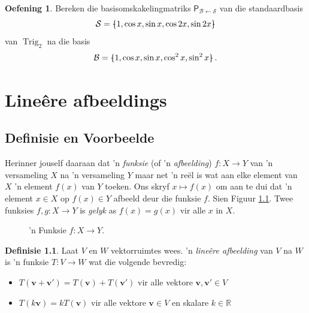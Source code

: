 \documentclass[a4paper,11pt]{book}
\theoremstyle{definition}
\newtheorem{definition}[theorem]{Definisie}
\newtheorem{exercise}{Oefening}
\newcommand{\ve}[1]{\mathbf{#1}}
\newcommand{\mat}[1]{\mathsf{#1}}
\newcommand{\basis}[1]{{\mathcal #1}}
\newcommand{\bmark}{\raisebox{.53ex}{\rule{.2em}{.1ex}}}
\newcommand{\bopen}{{\protect\ooalign{\{\cr\hfil\bmark\hfil\cr}}}
\newcommand{\bclose}{{\protect\ooalign{\}\cr\hfil\bmark\hfil\cr}}}
\DeclareMathOperator{\Trig}{Trig}
\begin{document}
\begin{exercise}
	Bereken die basisomskakelingmatriks $\mat{P}_{\basis{B} \leftarrow
	\basis{S}}$ van die standaardbasis
	\[
		\basis{S} = \bopen 1, \cos x, \sin x, \cos 2x, \sin 2x \bclose 
	\]
	van $\Trig_2$ na die basis 
	\[
		\basis{B} = \bopen 1, \cos x, \sin x, \cos^2 x, \sin^2 x \bclose \,
		.
	\]
\end{exercise}



\chapter{Line{\^e}re afbeeldings} \label{ACh3LinearMaps}

\section{Definisie en Voorbeelde}\label{ACh3Sec1DefinitionsExamples}

Herinner jouself daaraan dat 'n \emph{funksie} (of 'n \emph{afbeelding}) $f
: X \rightarrow Y$ van 'n versameling $X$ na 'n versameling $Y$ maar net
'n re{\"e}l is wat aan elke element van $X$ 'n element $f(x)$ van $Y$
toeken. Ons skryf $x \mapsto f(x)$ om aan te dui dat 'n element $x \in X$
op $f(x) \in Y$ afbeeld deur die funksie $f$.  Sien Figuur
\ref{explanation_of_mapsto}. Twee funksies $f, g : X \rightarrow Y$ is
\emph{gelyk} as $f(x) = g(x)$ vir alle $x$ in $X$. 



\begin{figure}[h]
	\begin{center}
	\end{center}
		
	\caption{\label{explanation_of_mapsto} 'n Funksie $f : X \rightarrow
	Y$.}
\end{figure}



\begin{definition} Laat $V$ en $W$ vektorruimtes wees. 'n \emph{line{\^e}re
	afbeelding} van $V$ na $W$ is 'n funksie $T : V \rightarrow W$ wat die
	volgende bevredig:
	\begin{itemize}
		\item  $T(\ve{v} + \ve{v}') = T(\ve{v}) + T(\ve{v}')$ vir alle
			vektore $\ve{v}, \ve{v}' \in V$
		\item $T(k \ve{v}) = k T (\ve{v})$ vir alle vektore $\ve{v} \in V$
			en skalare $k \in \mathbb{R}$
	\end{itemize}
\end{definition}
\end{document}
